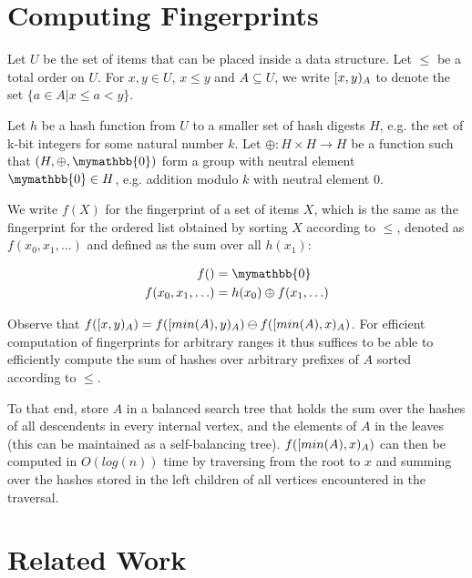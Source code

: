 \documentclass{article}
\begin{document}
\section{Computing Fingerprints}\label{computing-fingerprints}

Let $U$ be the set of items that can be placed inside a data structure. Let $\leq$ be a total order on $U$. For $x, y \in U$, $x \leq y$ and $A \subseteq U$, we write $[{x},{y})_{A}$ to denote the set $\{a \in A | x \leq a < y\}$.

Let $h$ be a hash function from $U$ to a smaller set of hash digests $H$, e.g. the set of k-bit integers for some natural number $k$.
Let $\oplus: H \times H \rightarrow H$ be a function such that $(H, \oplus, \mymathbb{0})$ form a group with neutral element $\mymathbb{0} \in H$, e.g. addition modulo $k$ with neutral element $0$.

We write $f(X)$ for the fingerprint of a set of items $X$, which is the same as the fingerprint for the ordered list obtained by sorting $X$ according to $\leq$, denoted as $f(x_0, x_1, \ldots)$ and defined as the sum over all $h(x_1)$:

\begin{align*}
f() &= \mymathbb{0}\\
f(x_0, x_1, \ldots) &= h(x_0) \oplus f(x_1, \ldots)\\
\end{align*}

Observe that $f([{x},{y})_{A}) = f([{min(A)},{y})_{A}) \ominus f([{min(A)},{x})_{A})$. For efficient computation of fingerprints for arbitrary ranges it thus suffices to be able to efficiently compute the sum of hashes over arbitrary prefixes of $A$ sorted according to $\leq$.

To that end, store $A$ in a balanced search tree that holds the sum over the hashes of all descendents in every internal vertex, and the elements of $A$ in the leaves (this can be maintained as a self-balancing tree). $f([{min(A)},{x})_{A})$ can then be computed in $O(log(n))$ time by traversing from the root to $x$ and summing over the hashes stored in the left children of all vertices encountered in the traversal.

\section{Related Work}\label{related-work}
\end{document}
